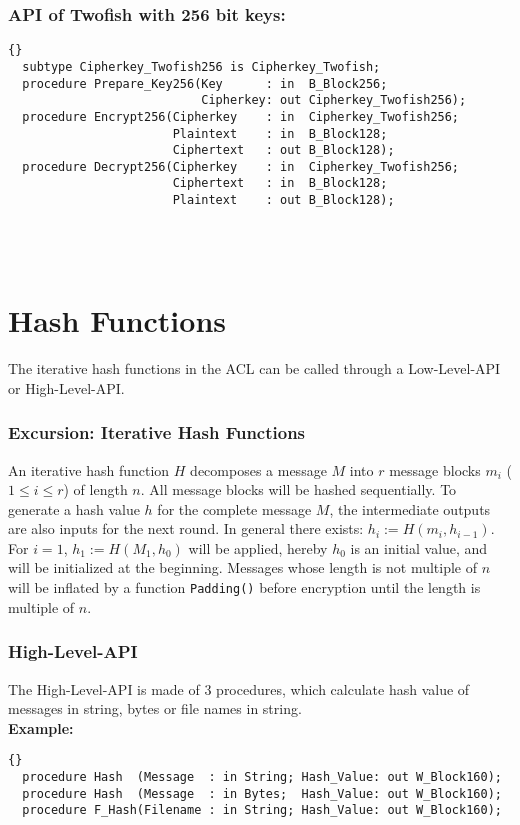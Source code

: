 \subsubsection*{API of Twofish with 256 bit keys:}
\begin{lstlisting}{}
  subtype Cipherkey_Twofish256 is Cipherkey_Twofish;
  procedure Prepare_Key256(Key      : in  B_Block256;
                           Cipherkey: out Cipherkey_Twofish256);
  procedure Encrypt256(Cipherkey    : in  Cipherkey_Twofish256;
                       Plaintext    : in  B_Block128;
                       Ciphertext   : out B_Block128);
  procedure Decrypt256(Cipherkey    : in  Cipherkey_Twofish256;
                       Ciphertext   : in  B_Block128;
                       Plaintext    : out B_Block128);
\end{lstlisting} \\ \ \\
\section{Hash Functions}\label{AlgorithmHash}
The iterative hash functions in the ACL can be called through a Low-Level-API or High-Level-API.
\subsubsection*{Excursion: Iterative Hash Functions}
An iterative hash function $H$ decomposes a message $M$ into $r$ message blocks $m_i$ ($1\leq i \leq r$) of length $n$. All message blocks will be hashed sequentially. To generate a hash value $h$ for the complete message $M$, the intermediate outputs are also inputs for the next round. %
In general there exists: $h_i:= H(m_i,h_{i-1})$. For $i=1$, $h_1:=H(M_1,h_0)$ will be applied, hereby $h_0$ is an initial value, and will be initialized at the beginning. Messages whose length is not multiple of $n$ will be inflated by a function \texttt{Padding()} before encryption until the length is multiple of $n$.%
\subsubsection*{High-Level-API}
The High-Level-API is made of 3 procedures, which calculate hash value of messages in string, bytes or file names in string.\\
\textbf{Example:}
\begin{lstlisting}{}
  procedure Hash  (Message  : in String; Hash_Value: out W_Block160);
  procedure Hash  (Message  : in Bytes;  Hash_Value: out W_Block160);
  procedure F_Hash(Filename : in String; Hash_Value: out W_Block160);
\end{lstlisting}
